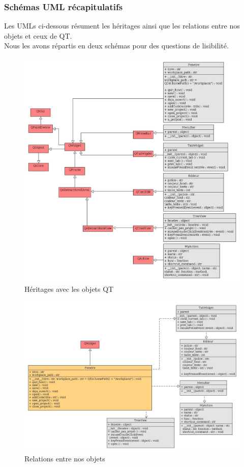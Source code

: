 \documentclass[a4paper,12pt]{article}
\begin{document}
			
		\subsubsection*{Schémas UML récapitulatifs}
		
			Les UMLs ci-dessous résument les héritages ainsi que les relations entre nos objets et ceux de QT.\\ 
			Nous les avons répartis en deux schémas pour des questions de lisibilité.
			
			\begin{figure}[h!]
				\includegraphics[scale=0.45]{images/uml_module_gui_heritage}
				\caption{Héritages avec les objets QT}
			\end{figure}
			
			\begin{figure}[h!]
				\includegraphics[scale=0.4]{images/uml_module_gui_relations}
				\caption{Relations entre nos objets}
			\end{figure}
			
\end{document}
